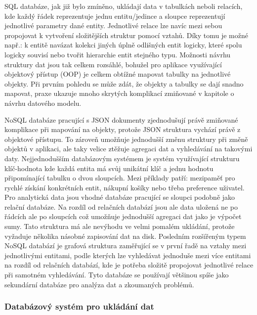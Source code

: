 \begin{itemize}
\begin{itemize}
	\Ac{SQL} databáze, jak již bylo zmíněno, ukládají data v tabulkách neboli relacích, kde každý řádek reprezentuje
	jednu entitu/jedince a sloupce reprezentují jednotlivé parametry dané entity.
	Jednotlivé relace lze navíc mezi sebou propojovat k vytvoření složitějších struktur pomocí vztahů.
	Díky tomu je možné např.: k entitě navázat kolekci jiných úplně odlišných entit logicky, které spolu logicky souvisí
	nebo tvořit hierarchie entit stejného typu.
	Možnosti návrhu struktury dat jsou tak celkem rozsáhlé, bohužel pro aplikace využívající objektový přístup (\noindent\Ac{OOP})
	je celkem obtížné mapovat tabulky na jednotlivé objekty.
	Při prvním pohledu se může zdát, že objekty a tabulky se dají snadno mapovat, praxe ukazuje mnoho skrytých komplikací
	zmiňované v kapitole o návrhu datového modelu. %

	\Ac{NoSQL} databáze pracující s \Ac{JSON} dokumenty zjednodušují právě zmiňované komplikace při mapování
	na objekty, protože \Ac{JSON} struktura vychází právě z objektové přístupu.
	To zároveň umožňuje jednodušší změnu struktury při změně objektů v aplikaci, ale taky velice ztěžuje agregaci dat
	a vyhledávání na takovými daty.
	Nejjednodušším databázovým systémem je systém využívající strukturu klíč-hodnota kde každá entita má svůj unikátní klíč
	a jednu hodnotu připomínající tabulku o dvou sloupcích.
	Mezi příklady patří: mezipaměť pro rychlé získání konkrétních entit, nákupní košíky nebo třeba preference uživatel.
	Pro analytická data jsou vhodné databáze pracující se sloupci podobně jako relační databáze.
	Na rozdíl od relačních databází jsou ale data uložená ne po řádcích ale po sloupcích což umožňuje jednodušší agregaci
	dat jako je výpočet sumy.
	Tato struktura má ale nevýhodu ve velmi pomalém ukládání, protože vyžaduje několika násobné zapisování dat na disk.
	Posledním rozšířeným typem \Ac{NoSQL} databází je grafová struktura zaměřující se v první řadě na vztahy mezi
	jednotlivými entitami, podle kterých lze vyhledávat jednoduše mezi více entitami na rozdíl od relačních databází, kde
	je potřeba složitě propojovat jednotlivé relace při samotném vyhledávání.
	Tyto databáze se používají většinou spíše jako sekundární databáze pro analýza dat a zkoumaných problémů.
	\cite{types-of-nosql-databases}

		\subsubsection{Databázový systém pro ukládání dat}


\end{itemize}
\end{itemize}
